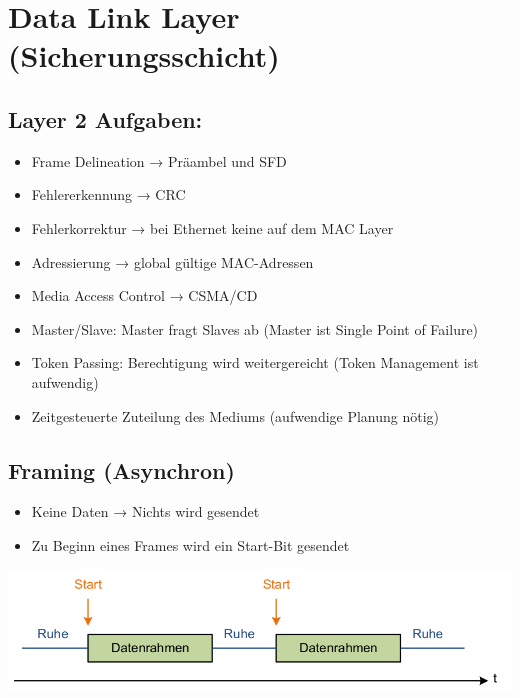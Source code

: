 
\newpage
\section{Data Link Layer (Sicherungsschicht)}

\subsection{Layer 2 Aufgaben:}{
    \begin{itemize}[noitemsep]
        \item  Frame Delineation → Präambel und SFD
        \item Fehlererkennung → CRC
        \item  Fehlerkorrektur → bei Ethernet keine auf dem MAC Layer
        \item  Adressierung → global gültige MAC-Adressen
        \item  Media Access Control → CSMA/CD
        \item Master/Slave: Master fragt Slaves ab (Master ist Single Point of Failure)
        \item  Token Passing: Berechtigung wird weitergereicht (Token Management ist aufwendig)
        \item  Zeitgesteuerte Zuteilung des Mediums (aufwendige Planung nötig)
    \end{itemize}
}




\subsection{Framing (Asynchron)}{
\begin{itemize}[noitemsep]
    \item Keine Daten → Nichts wird gesendet
    \item Zu Beginn eines Frames wird ein Start-Bit gesendet
\end{itemize}

{\includegraphics[scale=.3]{img/framing_async.png}}
}

